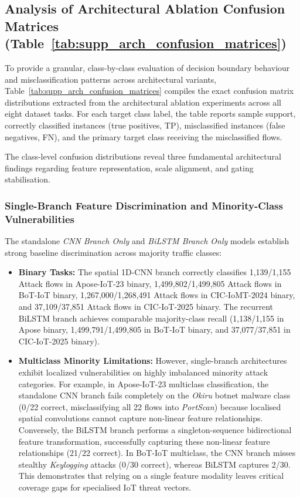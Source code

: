\documentclass[a4paper,fleqn]{cas-sc}
\begin{document}
\subsection{Analysis of Architectural Ablation Confusion Matrices (Table~\ref{tab:supp_arch_confusion_matrices})}

To provide a granular, class-by-class evaluation of decision boundary behaviour and misclassification patterns across architectural variants, Table~\ref{tab:supp_arch_confusion_matrices} compiles the exact confusion matrix distributions extracted from the architectural ablation experiments across all eight dataset tasks. For each target class label, the table reports sample support, correctly classified instances (true positives, TP), misclassified instances (false negatives, FN), and the primary target class receiving the misclassified flows.

The class-level confusion distributions reveal three fundamental architectural findings regarding feature representation, scale alignment, and gating stabilisation.

\subsubsection{Single-Branch Feature Discrimination and Minority-Class Vulnerabilities}
The standalone \textit{CNN Branch Only} and \textit{BiLSTM Branch Only} models establish strong baseline discrimination across majority traffic classes:
\begin{itemize}
    \item \textbf{Binary Tasks:} The spatial 1D-CNN branch correctly classifies 1,139/1,155 Attack flows in Apose-IoT-23 binary, 1,499,802/1,499,805 Attack flows in BoT-IoT binary, 1,267,000/1,268,491 Attack flows in CIC-IoMT-2024 binary, and 37,109/37,851 Attack flows in CIC-IoT-2025 binary. The recurrent BiLSTM branch achieves comparable majority-class recall (1,138/1,155 in Apose binary, 1,499,791/1,499,805 in BoT-IoT binary, and 37,077/37,851 in CIC-IoT-2025 binary).
    \item \textbf{Multiclass Minority Limitations:} However, single-branch architectures exhibit localized vulnerabilities on highly imbalanced minority attack categories. For example, in Apose-IoT-23 multiclass classification, the standalone CNN branch fails completely on the \textit{Okiru} botnet malware class (0/22 correct, misclassifying all 22 flows into \textit{PortScan}) because localised spatial convolutions cannot capture non-linear feature relationships. Conversely, the BiLSTM branch performs a singleton-sequence bidirectional feature transformation, successfully capturing these non-linear feature relationships (21/22 correct). In BoT-IoT multiclass, the CNN branch misses stealthy \textit{Keylogging} attacks (0/30 correct), whereas BiLSTM captures 2/30. This demonstrates that relying on a single feature modality leaves critical coverage gaps for specialised IoT threat vectors.
\end{itemize}
\end{document}
